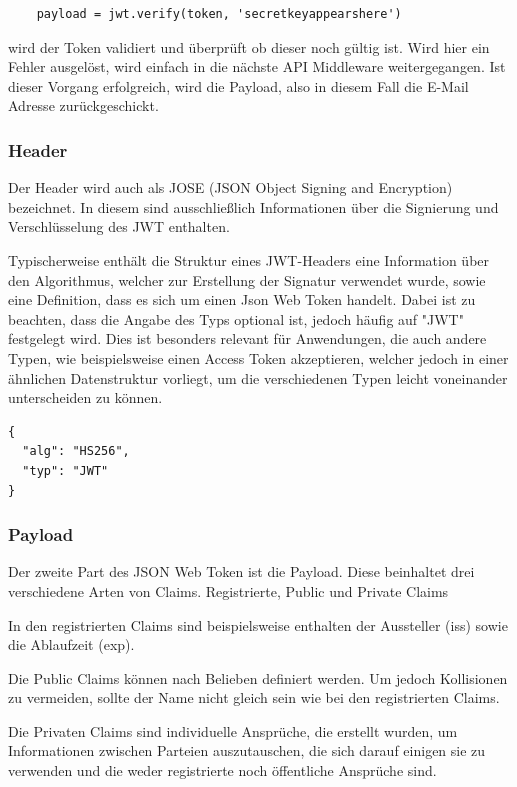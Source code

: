\begin{lstlisting}
    payload = jwt.verify(token, 'secretkeyappearshere')
\end{lstlisting}

wird der Token validiert und überprüft ob dieser noch gültig ist. Wird hier ein Fehler ausgelöst, wird einfach in die nächste API Middleware weitergegangen. Ist dieser Vorgang erfolgreich, wird die Payload, also in diesem Fall die E-Mail Adresse zurückgeschickt.\cite{JWT_2}


\subsubsection{Header}

Der Header wird auch als JOSE (JSON Object Signing and Encryption) bezeichnet. In diesem sind ausschließlich Informationen über die Signierung und Verschlüsselung des JWT enthalten.


Typischerweise enthält die Struktur eines JWT-Headers eine Information über den Algorithmus, welcher zur Erstellung der Signatur verwendet wurde, sowie eine Definition, dass es sich um einen Json Web Token handelt. Dabei ist zu beachten, dass die Angabe des Typs optional ist, jedoch häufig auf "JWT" festgelegt wird. Dies ist besonders relevant für Anwendungen, die auch andere Typen, wie beispielsweise einen Access Token akzeptieren, welcher jedoch in einer ähnlichen Datenstruktur vorliegt, um die verschiedenen Typen leicht voneinander unterscheiden zu können.

\begin{lstlisting}
{
  "alg": "HS256",
  "typ": "JWT"
}
\end{lstlisting}

\subsubsection{Payload}
Der zweite Part des JSON Web Token ist die Payload. Diese beinhaltet drei verschiedene Arten von Claims. 
Registrierte, Public und Private Claims

In den registrierten Claims sind beispielsweise enthalten der Aussteller (iss) sowie die Ablaufzeit (exp).

Die Public Claims können nach Belieben definiert werden. Um jedoch Kollisionen zu vermeiden, sollte der Name nicht gleich sein wie bei den registrierten Claims.

Die Privaten Claims sind individuelle Ansprüche, die erstellt wurden, um Informationen zwischen Parteien auszutauschen, die sich darauf einigen sie zu verwenden und die weder registrierte noch öffentliche Ansprüche sind.


